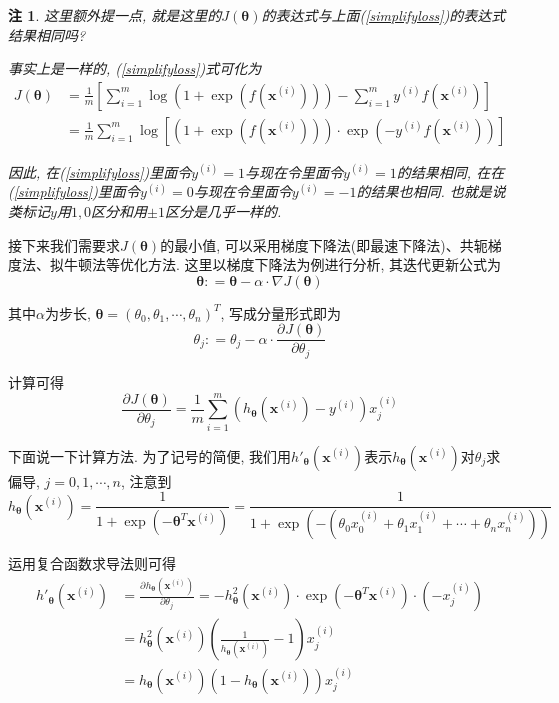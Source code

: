 \documentclass[a4paper,UTF8]{ctexart}
\theoremstyle{plain} \newtheorem{theorem}{定理}[section]
\theoremstyle{plain} \newtheorem{definition}{定义}[section]
\theoremstyle{plain} \newtheorem{lemma}{引理}[section]
\theoremstyle{plain} \newtheorem{proposition}{命题}[section]
\theoremstyle{plain} \newtheorem{example}{例}[section]
\theoremstyle{plain} \newtheorem{remark}{注}[section]
\theoremstyle{plain} \newtheorem{corollary}{推论}[section]
\newcommand{\p}[3]{\frac{\partial^{#1}#2}{\partial{#3}^{#1}}}  %
\begin{document}
\begin{remark}
这里额外提一点, 就是这里的$J(\bm{\theta})$的表达式与上面(\ref{simplifyloss})的表达式结果相同吗?

事实上是一样的, (\ref{simplifyloss})式可化为
\begin{align*}
J(\bm{\theta}) & = \frac{1}{m} \left[ \sum_{i=1}^{m} \log (1 + \exp (f(\bm{x}^{(i)}))) - \sum_{i=1}^{m} y^{(i)} f(\bm{x}^{(i)}) \right] \\ 
& = \frac{1}{m} \sum_{i=1}^{m} \log \left[ (1 + \exp (f(\bm{x}^{(i)}))) \cdot \exp (- y^{(i)} f(\bm{x}^{(i)})) \right]
\end{align*}

因此, 在(\ref{simplifyloss})里面令$y^{(i)} = 1$与现在令里面令$y^{(i)} = 1$的结果相同, 在在(\ref{simplifyloss})里面令$y^{(i)} = 0$与现在令里面令$y^{(i)} = -1$的结果也相同. 也就是说类标记$y$用$1, 0$区分和用$\pm 1$区分是几乎一样的.

\end{remark}

接下来我们需要求$J(\bm{\theta})$的最小值, 可以采用梯度下降法(即最速下降法)、共轭梯度法、拟牛顿法等优化方法. 这里以梯度下降法为例进行分析, 其迭代更新公式为
\begin{equation*}
\bm{\theta} : = \bm{\theta} - \alpha \cdot \nabla J(\bm{\theta})
\end{equation*}

其中$\alpha$为步长, $\bm{\theta} = (\theta_{0}, \theta_{1}, \cdots, \theta_{n})^{T}$, 写成分量形式即为
\begin{equation*}
\theta_{j} : = \theta_{j} - \alpha \cdot \p{}{J(\bm{\theta})}{\theta_{j}}
\end{equation*}

计算可得
\begin{equation*}
\p{}{J(\bm{\theta})}{\theta_{j}} = \frac{1}{m} \sum_{i=1}^{m} (h_{\bm{\theta}}(\bm{x}^{(i)}) - y^{(i)}) x_{j}^{(i)}
\end{equation*}

下面说一下计算方法. 为了记号的简便, 我们用$h'_{\bm{\theta}}(\bm{x}^{(i)})$表示$h_{\bm{\theta}}(\bm{x}^{(i)})$对$\theta_{j}$求偏导, $j = 0,1,\cdots,n$, 注意到
\begin{equation*}
h_{\bm{\theta}}(\bm{x}^{(i)}) = \frac{1}{1 + \exp (- \bm{\theta}^{T} \bm{x}^{(i)})} = \frac{1}{1 + \exp (-(\theta_{0} x_{0}^{(i)} + \theta_{1} x_{1}^{(i)} + \cdots + \theta_{n} x_{n}^{(i)}))}
\end{equation*}

运用复合函数求导法则可得
\begin{align*}
h'_{\bm{\theta}}(\bm{x}^{(i)}) & = \p{}{h_{\bm{\theta}}(\bm{x}^{(i)})}{\theta_{j}} = - h^{2}_{\bm{\theta}}(\bm{x}^{(i)}) \cdot \exp (-\bm{\theta}^{T} \bm{x}^{(i)}) \cdot (- x_{j}^{(i)}) \\
& = h^{2}_{\bm{\theta}}(\bm{x}^{(i)}) \left( \frac{1}{h_{\bm{\theta}}(\bm{x}^{(i)})} - 1 \right) x_{j}^{(i)} \\
& = h_{\bm{\theta}}(\bm{x}^{(i)}) (1 - h_{\bm{\theta}}(\bm{x}^{(i)})) x_{j}^{(i)}
\end{align*}
\end{document}
